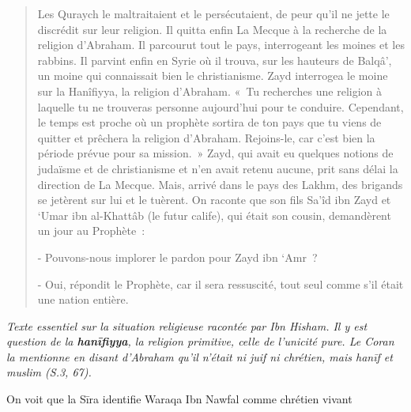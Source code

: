 \begin{quotation}
Les Quraych le maltraitaient et le persécutaient, de peur qu'il ne jette
le discrédit sur leur religion. Il quitta enfin La Mecque à la recherche
de la religion d'Abraham. Il parcourut tout le pays, interrogeant les
moines et les rabbins. Il parvint enfin en Syrie où il trouva, sur les
hauteurs de Balqâ', un moine qui connaissait bien le christianisme. Zayd
interrogea le moine sur la Hanîfiyya, la religion d'Abraham. «~Tu
recherches une religion à laquelle tu ne trouveras personne aujourd'hui
pour te conduire. Cependant, le temps est proche où un prophète sortira
de ton pays que tu viens de quitter et prêchera la religion d'Abraham.
Rejoins-le, car c'est bien la période prévue pour sa mission.~» Zayd,
qui avait eu quelques notions de judaïsme et de christianisme et n'en
avait retenu aucune, prit sans délai la direction de La Mecque. Mais,
arrivé dans le pays des Lakhm, des brigands se jetèrent sur lui et le
tuèrent. On raconte que son fils Sa'îd ibn Zayd et `Umar ibn al-Khattâb
(le futur calife), qui était son cousin, demandèrent un jour au
Prophète~:

- Pouvons-nous implorer le pardon pour Zayd ibn `Amr~?

- Oui, répondit le Prophète, car il sera ressuscité, tout seul comme
s'il était une nation entière.
\end{quotation}
\emph{Texte essentiel sur la situation religieuse racontée par Ibn
Hisham. Il y est question de la \textbf{hanīfiyya}, la religion primitive, celle
de l'unicité pure. Le Coran la mentionne en disant d'Abraham qu'il
n'était ni juif ni chrétien, mais hanīf et muslim (S.3, 67).}

On voit que la Sīra identifie Waraqa Ibn Nawfal comme chrétien vivant

